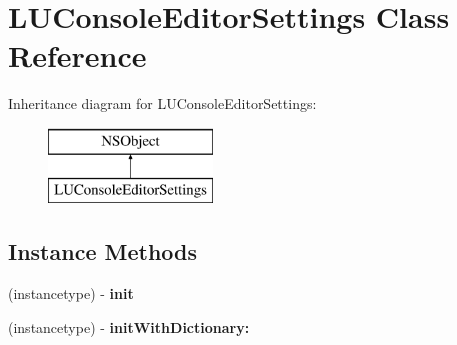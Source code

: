 \hypertarget{interface_l_u_console_editor_settings}{}\section{L\+U\+Console\+Editor\+Settings Class Reference}
\label{interface_l_u_console_editor_settings}
Inheritance diagram for L\+U\+Console\+Editor\+Settings\+:\begin{figure}[H]
\begin{center}
\leavevmode
\includegraphics[height=2.000000cm]{interface_l_u_console_editor_settings}
\end{center}
\end{figure}
\subsection*{Instance Methods}
\begin{DoxyCompactItemize}
\item 
\mbox{\label{interface_l_u_console_editor_settings_a42f4fce965a3e9602d96386662bae3cf}} 
(instancetype) -\/ {\bfseries init}
\item 
\mbox{\label{interface_l_u_console_editor_settings_a60fd36970b76ea050c39c9a3db571c79}} 
(instancetype) -\/ {\bfseries init\+With\+Dictionary\+:}
\end{DoxyCompactItemize}
